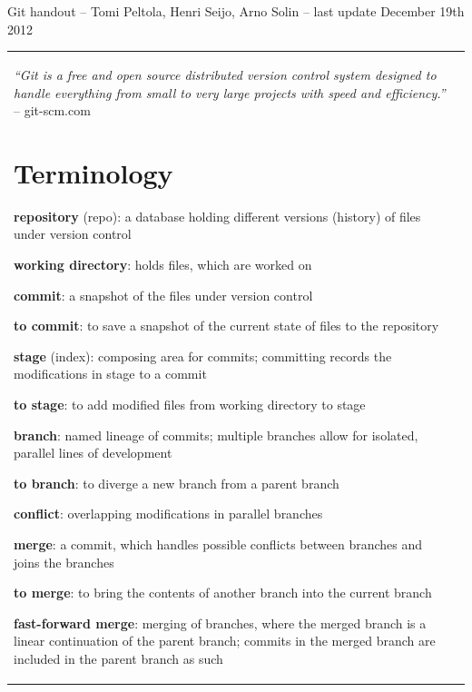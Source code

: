 \documentclass[landscape]{article}
\begin{document}
\pagestyle{empty}

\textsf{ {\LARGE Git handout} -- Tomi Peltola, Henri Seijo, Arno Solin -- last update December 19th 2012}
\vspace{\baselineskip}\\
\begin{tabular*}{1\textwidth}{@{\extracolsep{\fill}} p{} p{}}
\begin{minipage}[t]{0.315\textwidth}
\textit{``Git is a free and open source distributed version control system designed to handle everything from small to very large projects with speed and efficiency.''} -- git-scm.com

\section{Terminology}
\begin{myitemize}
  \item \textbf{repository} (repo): a database holding different versions (history) of files under version control
  \item \textbf{working directory}: holds files, which are worked on
  \item \textbf{commit}: a snapshot of the files under version control
  \item \textbf{to commit}: to save a snapshot of the current state of files to the repository
  \item \textbf{stage} (index): composing area for commits; committing records the modifications in stage to a commit
  \item \textbf{to stage}: to add modified files from working directory to stage
  \item \textbf{branch}: named lineage of commits; multiple branches allow for isolated, parallel lines of development
  \item \textbf{to branch}: to diverge a new branch from a parent branch
  \item \textbf{conflict}: overlapping modifications in parallel branches
  \item \textbf{merge}: a commit, which handles possible conflicts between branches and joins the branches
  \item \textbf{to merge}: to bring the contents of another branch into the current branch
  \item \textbf{fast-forward merge}: merging of branches, where the merged branch is a linear continuation of the parent branch; commits in the merged branch are included in the parent branch as such

\end{myitemize}
\end{minipage}
\end{tabular*}
\end{document}
